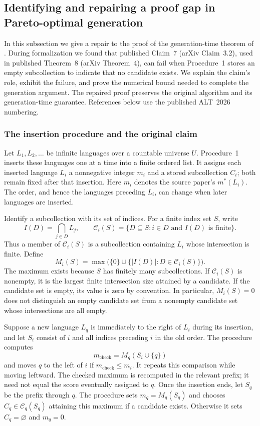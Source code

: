 \subsection{Identifying and repairing a proof gap in Pareto-optimal generation}
\label{app:pareto-repair}

In this subsection we give a repair to the proof of the generation-time
theorem of \citet[][P13]{charikar2026pareto}. During formalization we
found that published Claim~7 (arXiv Claim~3.2), used in published
Theorem~8 (arXiv Theorem~4), can fail when Procedure~1 stores an empty
subcollection to indicate that no candidate exists. We explain the
claim's role, exhibit the failure, and prove the numerical bound needed
to complete the generation argument. The repaired proof preserves the
original algorithm and its generation-time guarantee. References below
use the published ALT~2026 numbering.

\subsubsection{The insertion procedure and the original claim}

Let $L_1,L_2,\ldots$ be infinite languages over a countable universe $U$.
Procedure~1 inserts these languages one at a time into a finite ordered
list. It assigns each inserted language $L_i$ a nonnegative integer
$m_i$ and a stored subcollection $C_i$; both remain fixed after that
insertion. Here $m_i$ denotes the source paper's $m^*(L_i)$. The order,
and hence the languages preceding $L_i$, can change when later languages
are inserted.

Identify a subcollection with its set of indices. For a finite
index set $S$, write
\[
 I(D)=\bigcap_{j\in D}L_j,
 \qquad
 \mathcal C_i(S)=
 \{D\subseteq S:i\in D\text{ and }I(D)\text{ is finite}\}.
\]
Thus a member of $\mathcal C_i(S)$ is a subcollection containing $L_i$
whose intersection is finite. Define
\[
 M_i(S)=\max\bigl(\{0\}\cup
       \{|I(D)|:D\in\mathcal C_i(S)\}\bigr).
\]
The maximum exists because $S$ has finitely many subcollections. If
$\mathcal C_i(S)$ is nonempty, it is the largest finite intersection
size attained by a candidate. If the candidate set is empty, its value
is zero by convention. In particular, $M_i(S)=0$ does not distinguish
an empty candidate set from a nonempty candidate set whose intersections
are all empty.

Suppose a new language $L_q$ is immediately to the right of $L_i$ during
its insertion, and let $S_i$ consist of $i$ and all indices preceding
$i$ in the old order. The procedure computes
\[
 m_{\mathrm{check}}=M_q(S_i\cup\{q\})
\]
and moves $q$ to the left of $i$ if
$m_{\mathrm{check}}\le m_i$. It repeats this comparison while moving
leftward. The checked maximum is recomputed in the relevant prefix;
it need not equal the score eventually assigned to $q$. Once the
insertion ends, let $S_q$ be the prefix through $q$. The procedure sets
$m_q=M_q(S_q)$ and chooses $C_q\in\mathcal C_q(S_q)$ attaining this
maximum if a candidate exists. Otherwise it sets $C_q=\varnothing$
and $m_q=0$.

